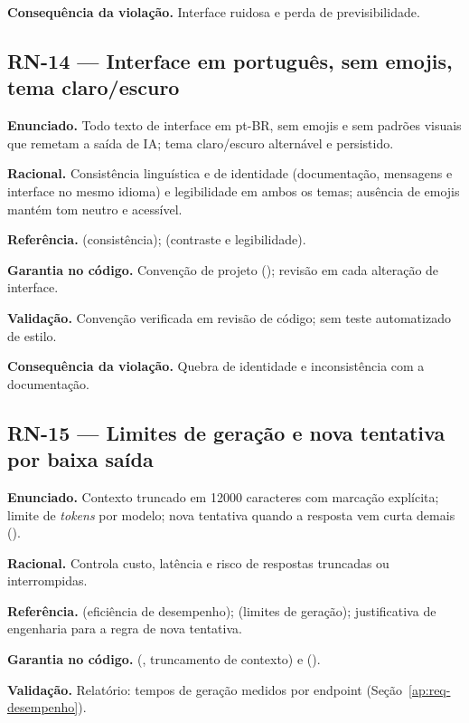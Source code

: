 \textbf{Consequência da violação.} Interface ruidosa e perda de previsibilidade.

\subsection{RN-14 --- Interface em português, sem emojis, tema claro/escuro}

\textbf{Enunciado.} Todo texto de interface em pt-BR, sem emojis e sem padrões visuais que remetam a saída de IA; tema claro/escuro alternável e persistido.

\textbf{Racional.} Consistência linguística e de identidade (documentação, mensagens e interface no mesmo idioma) e legibilidade em ambos os temas; ausência de emojis mantém tom neutro e acessível.

\textbf{Referência.} \cite{nielsen_1993} (consistência); \cite{w3c_wcag_22} (contraste e legibilidade).

\textbf{Garantia no código.} Convenção de projeto (); revisão em cada alteração de interface.

\textbf{Validação.} Convenção verificada em revisão de código; sem teste automatizado de estilo.

\textbf{Consequência da violação.} Quebra de identidade e inconsistência com a documentação.

\subsection{RN-15 --- Limites de geração e nova tentativa por baixa saída}

\textbf{Enunciado.} Contexto truncado em 12000 caracteres com marcação explícita; limite de \emph{tokens} por modelo; nova tentativa quando a resposta vem curta demais (\texttt{}).

\textbf{Racional.} Controla custo, latência e risco de respostas truncadas ou interrompidas.

\textbf{Referência.} \cite{iso_25010} (eficiência de desempenho); \cite{ollama_2025} (limites de geração); justificativa de engenharia para a regra de nova tentativa.

\textbf{Garantia no código.}  (\texttt{}, truncamento de contexto) e  (\texttt{}).

\textbf{Validação.} Relatório: tempos de geração medidos por endpoint (Seção~\ref{ap:req-desempenho}).

